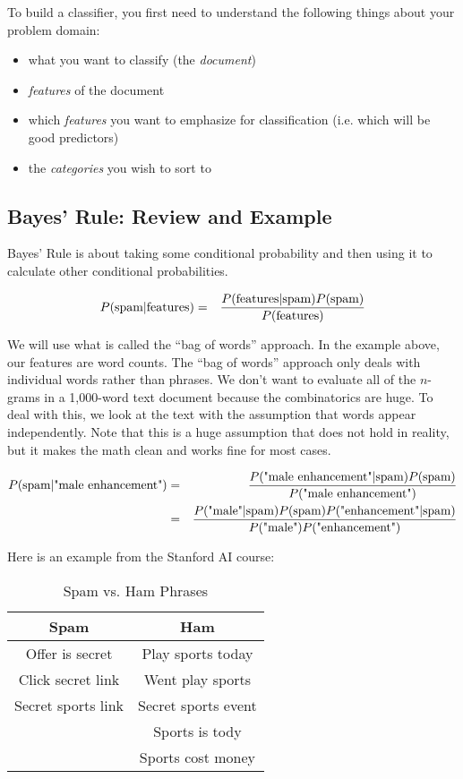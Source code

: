 \documentclass[12pt,letter]{article}
\begin{document}
To build a classifier, you first need to understand the following
things about your problem domain: 
\begin{itemize}
\item what you want to classify (the \emph{document})
\item \emph{features} of the document
\item which \emph{features} you want to emphasize for classification
  (i.e. which will be good predictors)
\item the \emph{categories} you wish to sort to
\end{itemize}

\subsection{Bayes' Rule: Review and Example}
Bayes' Rule is about taking some conditional probability and then
using it to calculate other conditional probabilities.

\begin{eqnarray*}
P(\text{spam}|\text{features}) &=&
{{P(\text{features}|\text{spam})P(\text{spam})} \over P(\text{features})}
\end{eqnarray*}

We will use what is called the ``bag of words'' approach. In the
example above, our features are word counts. The ``bag of words''
approach only deals with individual words rather than phrases. We
don't want to evaluate all of the $n$-grams in a 1,000-word text
document because the combinatorics are huge. To deal with this, we
look at the text with the assumption that words appear
independently. Note that this is a huge assumption that does not hold
in reality, but it makes the math clean and works fine for most
cases.\footnotemark {} 

\begin{eqnarray*}
P(\text{spam}|\text{"male enhancement"}) &=&
{{P(\text{"male enhancement"}|\text{spam})P(\text{spam})} \over
  P(\text{"male enhancement"})} \\
&=& {{P(\text{"male"}|\text{spam})P(\text{spam})P(\text{"enhancement"}|\text{spam})} \over
  P(\text{"male"}) P(\text{"enhancement"})} 
\end{eqnarray*}

Here is an example from the Stanford AI course:
\begin{table}[h!]
\caption{Spam vs. Ham Phrases}
\label{spam}
\centering
\begin{tabular}{c|c}
Spam & Ham \\
\hline
Offer is secret & Play sports today \\
Click secret link & Went play sports \\
Secret sports link & Secret sports event \\
& Sports is tody \\
& Sports cost money 
\end{tabular}
\end{table}
\end{document}
